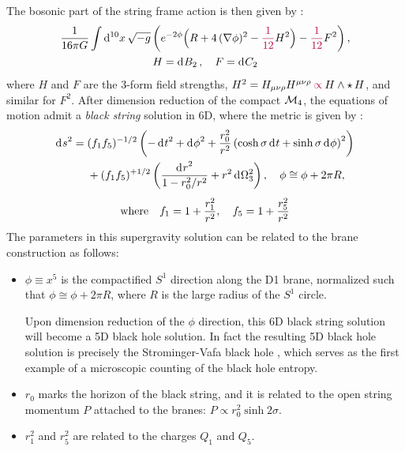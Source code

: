 \documentclass[11pt,a4paper]{article}
\begin{document}
	The bosonic part of the string frame action is then given by \needcites:
	\begin{gather}
		\frac{1}{16\pi G}
		\int \dd[10]{x} \sqrt{-g}
			\pqty{
				e^{-2\phi} \Big(
					R + 4\,(\nabla\phi)^2
					- \sidenote{\frac{1}{12}} H^2
				\Big)
				- \sidenote{\frac{1}{12}} F^2
			},
	\\
		H = \dd{B_2},\quad
		F = \dd{C_2}
	\end{gather}
	where $H$ and $F$ are the 3-form field strengths, $H^2 = H_{\mu\nu\rho} H^{\mu\nu\rho} \mathbin{\sidenote{\propto}} H\wedge \hstar H$, and similar for $F^2$. 
	After dimension reduction of the compact $\mcal{M}_4$, the equations of motion admit a \textit{black string} solution in 6D, where the metric is given by \needcites:
	\begin{gather}
	\begin{aligned}
		\dd{s}^2
		= {} & (f_1 f_5)^{-1/2} \pqty{
				-\dd{t}^2 + \dd{\phi}^2
				+ \frac{r_0^2}{r^2} \pqty{
					\cosh\sigma \dd{t}
					+ \sinh\sigma \dd{\phi}
				}^2
			} \\
		& {} + (f_1 f_5)^{+1/2} \pqty{
				\frac{\dd{r}^2}{1 - r_0^2 / r^2}
				+ r^2 \dd{\Omega_3^2}
			},
		\quad \phi \cong \phi + 2\pi R,
	\end{aligned}
	\\[1ex] \text{where}
	\quad f_1 = 1 + \frac{r_1^2}{r^2},
	\quad f_5 = 1 + \frac{r_5^2}{r^2}
	\end{gather}
	The parameters in this supergravity solution can be related to the brane construction as follows:
	\begin{itemize}
		\item $\phi \equiv x^5$ is the compactified $S^1$ direction along the D1 brane, normalized such that $\phi \cong \phi + 2\pi R$, where $R$ is the large radius of the $S^1$ circle. 
		
		Upon dimension reduction of the $\phi$ direction, this 6D black string solution will become a 5D black hole solution. In fact the resulting 5D black hole solution is precisely the Strominger-Vafa black hole \cite{Strominger:1996sh}, which serves as the first example of a microscopic counting of the black hole entropy. 
		
		\item $r_0$ marks the horizon of the black string, and it is related to the open string momentum $P$ attached to the branes: $P \propto r_0^2 \sinh 2\sigma$. 
		
		\item $r_1^2$ and $r_5^2$ are related to the charges $Q_1$ and $Q_5$. 
	\end{itemize}
	
\end{document}
